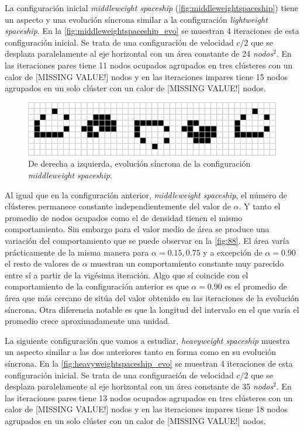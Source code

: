 \documentclass[../proyecto.tex]{memoir}
\begin{document}
La configuración inicial \textit{middleweight spaceship} (\autoref{fig:middleweightspaceship}) tiene un aspecto y una evolución síncrona similar a la configuración \textit{lightweight spaceship}. En la \autoref{fig:middleweightspaceship_evo} se muestran 4 iteraciones de esta configuración inicial. Se trata de una configuración de velocidad $c/2$ que se desplaza paralelamente al eje horizontal con un área constante de 24 \textit{nodos}$^2$. En las iteraciones pares tiene 11 nodos ocupados agrupados en tres clústeres con un calor de [MISSING VALUE!] nodos y en las iteraciones impares tiene 15 nodos agrupados en un solo clúster con un calor de [MISSING VALUE!] nodos.

\begin{figure}[H]
	\centering
    \includegraphics[width=\textwidth]{./images/middleweightspaceship_evo.png}
    \caption{De derecha a izquierda, evolución síncrona de la configuración \textit{middleweight spaceship}.}
    \label{fig:middleweightspaceship_evo}
\end{figure}

Al igual que en la configuración anterior, \textit{middleweight spaceship}, el número de clústeres permanece constante independientemente del valor de $\alpha$. Y tanto el promedio de nodos ocupados como el de densidad tienen el mismo comportamiento. Sin embargo para el valor medio de área se produce una variación del comportamiento que se puede observar en la \autoref{fig:88}. El área varía prácticamente de la misma manera para $\alpha=0.15, 0.75$ y a excepción de $\alpha=0.90$ el resto de valores de $\alpha$ muestran un comportamiento constante muy parecido entre sí a partir de la vigésima iteración. Algo que sí coincide con el comportamiento de la configuración anterior es que $\alpha=0.90$ es el promedio de área que más cercano de sitúa del valor obtenido en las iteraciones de la evolución síncrona. Otra diferencia notable es que la longitud del intervalo en el que varía el promedio crece aproximadamente una unidad.

La siguiente configuración que vamos a estudiar, \textit{heavyweight spaceship} muestra un aspecto similar a las dos anteriores tanto en forma como en su evolución síncrona. En la \autoref{fig:heavyweightspaceship_evo} se muestran 4 iteraciones de esta configuración inicial. Se trata de una configuración de velocidad $c/2$ que se desplaza paralelamente al eje horizontal con un área constante de 35 \textit{nodos}$^2$. En las iteraciones pares tiene 13 nodos ocupados agrupados en tres clústeres con un calor de [MISSING VALUE!] nodos y en las iteraciones impares tiene 18 nodos agrupados en un solo clúster con un calor de [MISSING VALUE!] nodos.
\end{document}
